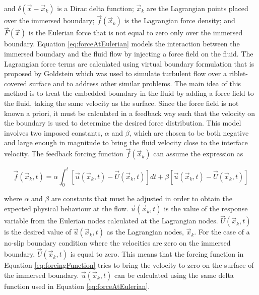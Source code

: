 \documentclass{aiaa-pretty}
\begin{document}
and $\delta(\vec{x} - \vec{x}_k)$ is a Dirac delta function; $\vec{x}_k$ are the Lagrangian points placed over the immersed boundary; $\vec{f}(\vec{x}_k)$ is the Lagrangian force density; and $\vec{F}(\vec{x})$ is the Eulerian force that is not equal to zero only over the immersed boundary. Equation \eqref{eq:forceAtEulerian} models the interaction between the immersed boundary and the fluid flow by injecting a force field on the fluid. The Lagrangian force terms are calculated using virtual boundary formulation that is proposed by Goldstein \cite{goldstein1993modeling} which was used to simulate turbulent flow over a riblet-covered surface and to address other similar problems. The main idea of this method is to treat the embedded boundary in the fluid by adding a force field to the fluid, taking the same velocity as the surface. Since the force field is not known a priori, it must be calculated in a feedback way such that the velocity on the boundary is used to determine the desired force distribution. This model involves two imposed constants, $\alpha$ and $\beta$, which are chosen to be both negative and large enough in magnitude to bring the fluid velocity close to the interface velocity. The feedback forcing function $\vec{f}(\vec{x}_k)$ can assume the expression as

%
\begin{equation}\label{eq:forcingFunction}
	\vec{f}\left( \vec{x}_k, t \right) = 
	\alpha \int_0^t \left[ \vec{u}\left( \vec{x}_k, t \right) - \vec{U}\left( \vec{x}_k, t \right) \right]dt + 
	\beta \left[ \vec{u}\left( \vec{x}_k, t \right) - \vec{U}\left( \vec{x}_k, t \right) \right]
\end{equation}
%

where $\alpha$ and $\beta$ are constants that must be adjusted in order to obtain the expected physical behaviour at the flow. $\vec{u}\left( \vec{x}_k, t \right)$ is the value of the response variable from the Eulerian nodes calculated at the Lagrangian nodes. $\vec{U}\left( \vec{x}_k, t \right)$ is the desired value of $\vec{u}\left( \vec{x}_k, t \right)$ as the Lagrangian nodes, $\vec{x}_k$. For the case of a no-slip boundary condition where the velocities are zero on the immersed boundary, $\vec{U}\left( \vec{x}_k, t \right)$ is equal to zero. This means that the forcing function in Equation \eqref{eq:forcingFunction} tries to bring the velocity to zero on the surface of the immersed boundary. $\vec{u}\left( \vec{x}_k, t \right)$ can be calculated using the same delta function used in Equation \eqref{eq:forceAtEulerian}.
\end{document}
